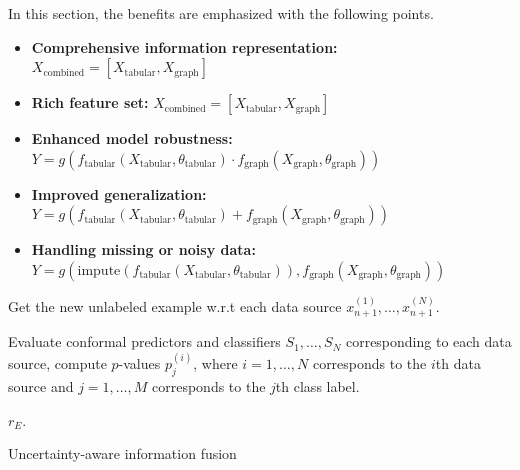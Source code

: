 In this section, the benefits are emphasized with the following points.

\begin{itemize}
    

    \item \textbf{Comprehensive information representation:} 
   \( X_{\text{combined}} = [X_{\text{tabular}}, X_{\text{graph}}] \)

    \item \textbf{Rich feature set:}
   \( X_{\text{combined}} = [X_{\text{tabular}}, X_{\text{graph}}] \)

    \item \textbf{Enhanced model robustness:}
   \( Y = g(f_{\text{tabular}}(X_{\text{tabular}}, \theta_{\text{tabular}}) \cdot f_{\text{graph}}(X_{\text{graph}}, \theta_{\text{graph}})) \)

    \item \textbf{Improved generalization:}
   \( Y = g(f_{\text{tabular}}(X_{\text{tabular}}, \theta_{\text{tabular}}) + f_{\text{graph}}(X_{\text{graph}}, \theta_{\text{graph}})) \)

    \item \textbf{Handling missing or noisy data:}
   \( Y = g(\text{impute}(f_{\text{tabular}}(X_{\text{tabular}}, \theta_{\text{tabular}})), f_{\text{graph}}(X_{\text{graph}}, \theta_{\text{graph}})) \)

\end{itemize}

\begin{algorithm}[!b]
\small
{}


Get the new unlabeled example w.r.t each data source $x^{(1)}_{n+1}, \ldots, x^{(N)}_{n+1}$.

Evaluate conformal predictors and classifiers $S_1, \ldots, S_N$ corresponding to each data source, compute $p$-values $p^{(i)}_j$, where $i = 1, \ldots, N$ corresponds to the $i$th data source and $j = 1, \ldots, M$ corresponds to the $j$th class label.


\Return $r_E$.
\caption{Uncertainty-aware information fusion}
\label{algo:mcp}
\end{algorithm}


